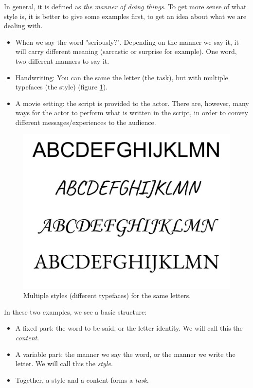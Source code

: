   \par In general, it is defined as \textit{the manner of doing things}\citep{gallaher1992individual}. To get more sense of what style is, it is better to give some examples first, to get an idea about what we are dealing with.
  \begin{itemize}
    \item When we say the word "seriously?". Depending on the manner we say it, it will carry different meaning (sarcastic or surprise for example). One word, two different manners to say it.
    \item Handwriting: You can the same the letter (the task), but with multiple typefaces (the style) (figure \ref{fig:different_fonts}).
    \item A movie setting: the script is provided to the actor. There are, however, many ways for the actor to perform what is written in the script, in order to convey different messages/experiences to the audience.
  \end{itemize}

  \begin{figure}[!htbp]
    \begin{center}
      \includegraphics[scale=0.3]{./images/introduction/different_fonts.jpg}
    \end{center}
    \caption{Multiple styles (different typefaces) for the same letters.}
    \label{fig:different_fonts}
  \end{figure}

  In these two examples, we see a basic structure:
  \begin{itemize}
    \item A fixed part: the word to be said, or the letter identity. We will call this the \textit{content}.
    \item A variable part: the manner we say the word, or the manner we write the letter. We will call this the \textit{style}.
    \item Together, a style and a content forms a \textit{task}.
  \end{itemize}

